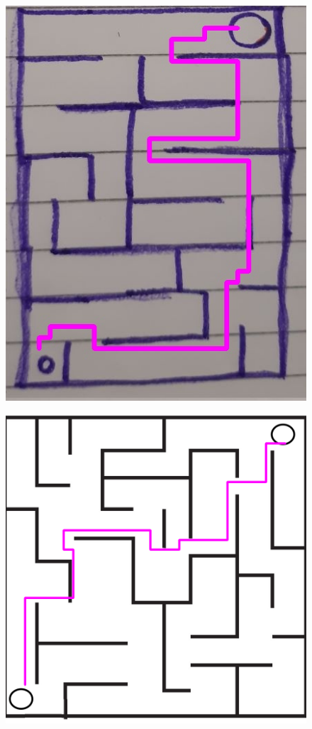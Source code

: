 \documentclass[conference]{IEEEtran}
\begin{document}
\begin{figure}[h!]
   \centering
    {\includegraphics[scale=0.3]{solutionmedium.jpg}}
\end{figure}
\begin{figure}[h!]
   \centering
    {\includegraphics[scale=0.15]{solutionhard.png}}
\end{figure}
\end{document}
